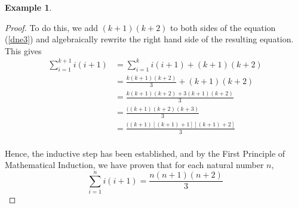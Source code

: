 \documentclass{book}
\theoremstyle{definition}
\newtheorem{example}{Example}[definition]
\theoremstyle{remark}
\begin{document}
\begin{example}
\begin{proof}
        To do this, we add $(k+1)(k+2)$ to both sides of the equation (\ref{dne3}) and algebraically rewrite the right hand side of the resulting equation. This gives
            \begin{align*}
                \sum_{i=1}^{k+1}{i(i+1)} & = \sum_{i=1}^{k}{i(i+1)} + (k+1)(k+2) \\               
                    & = \frac{k(k+1)(k+2)}{3} + (k+1)(k+2) \\
                    & = \frac{k(k+1)(k+2) + 3(k+1)(k+2)}{3} \\  
                    & = \frac{((k+1)(k+2)(k+3)}{3} \\                  
                    & = \frac{((k+1)[(k+1)+1][(k+1)+2]}{3} \\                 
            \end{align*}
        
        Hence, the inductive step has been established, and by the First Principle of Mathematical Induction, we have proven that for each natural number $n$,
            \begin{equation*}
                \sum_{i=1}^{n}{i(i+1)} = \frac{n(n+1)(n+2)}{3}
            \end{equation*}
    \end{proof}
\end{example}
\end{document}
